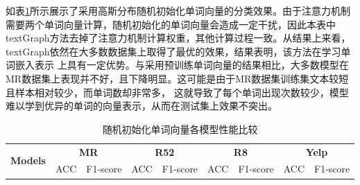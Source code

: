 如表\ref{tab:without pre}所示展示了采用高斯分布随机初始化单词向量的分类效果。由于注意力机制需要两个单词向量计算，随机初始化的单词向量会造成一定干扰，因此本表中
textGraph方法去掉了注意力机制计算权重，其他计算过程一致。从结果上来看，textGraph依然在大多数数据集上取得了最优的效果，结果表明，该方法在学习单词嵌入表示
上具有一定优势。与采用预训练单词向量的结果相比，大多数模型在MR数据集上表现并不好，且下降明显。这可能是由于MR数据集训练集文本较短且样本相对较少，而单词数却非常多，
这就导致了每个单词出现次数较少，模型难以学到优异的单词的向量表示，从而在测试集上效果不突出。

\begin{table}[htb]
    \centering
    \caption{随机初始化单词向量各模型性能比较}
    \label{tab:without pre}
    \renewcommand\arraystretch{1}
    \renewcommand\tabcolsep{0.7mm}
    \begin{tabular}{lcccccccc}
    \hline
    \multirow{2}{*}{\textbf{Models}} & \multicolumn{2}{c}{\textbf{MR}} & \multicolumn{2}{c}{\textbf{R52}} & \multicolumn{2}{c}{\textbf{R8}} & \multicolumn{2}{c}{\textbf{Yelp}}                                \\
    \cline{2-9}
                            & \multicolumn{1}{c}{ACC} & \multicolumn{1}{c}{F1-score} & \multicolumn{1}{c}{ACC} & \multicolumn{1}{c}{F1-score} & \multicolumn{1}{c}{ACC} & \multicolumn{1}{c}{F1-score} & \multicolumn{1}{c}{ACC} & \multicolumn{1}{c}{F1-score}  \\
    \hline
    

\end{tabular}
\end{table}
